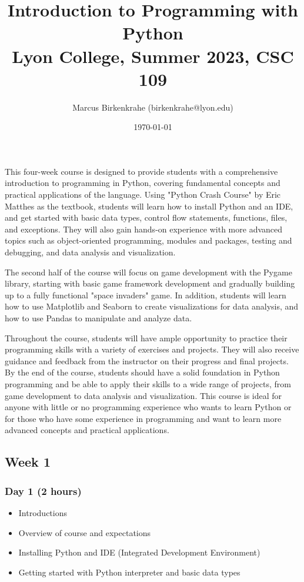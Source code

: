 \documentclass[11pt]{article}
\author{Marcus Birkenkrahe (birkenkrahe@lyon.edu)}
\date{\today}
\title{Introduction to Programming with Python\\\medskip
\large Lyon College, Summer 2023, CSC 109}
\begin{document}
\maketitle
This four-week course is designed to provide students with a
comprehensive introduction to programming in Python, covering
fundamental concepts and practical applications of the language. Using
"Python Crash Course" by Eric Matthes as the textbook, students will
learn how to install Python and an IDE, and get started with basic
data types, control flow statements, functions, files, and
exceptions. They will also gain hands-on experience with more advanced
topics such as object-oriented programming, modules and packages,
testing and debugging, and data analysis and visualization.

The second half of the course will focus on game development with the
Pygame library, starting with basic game framework development and
gradually building up to a fully functional "space invaders" game. In
addition, students will learn how to use Matplotlib and Seaborn to
create visualizations for data analysis, and how to use Pandas to
manipulate and analyze data.

Throughout the course, students will have ample opportunity to
practice their programming skills with a variety of exercises and
projects. They will also receive guidance and feedback from the
instructor on their progress and final projects. By the end of the
course, students should have a solid foundation in Python programming
and be able to apply their skills to a wide range of projects, from
game development to data analysis and visualization. This course is
ideal for anyone with little or no programming experience who wants to
learn Python or for those who have some experience in programming and
want to learn more advanced concepts and practical applications.

\subsection*{Week 1}
\label{sec:org39a4710}
\subsubsection*{Day 1 (2 hours)}
\label{sec:orgc6e917f}

\begin{itemize}
\item Introductions
\item Overview of course and expectations
\item Installing Python and IDE (Integrated Development Environment)
\item Getting started with Python interpreter and basic data types
\end{itemize}
\end{document}

